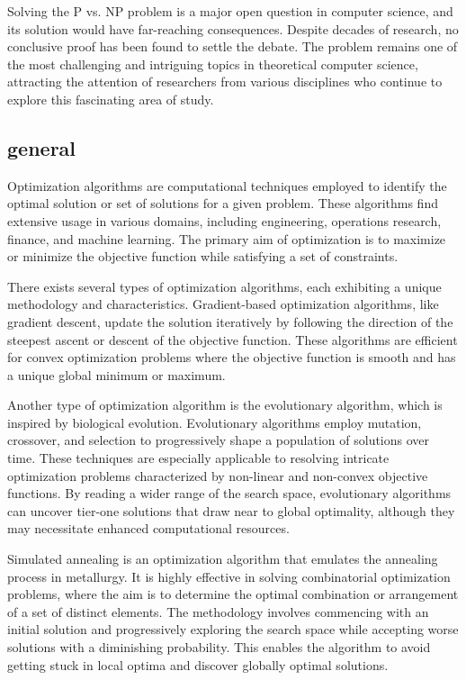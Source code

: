 Solving the P vs. NP problem is a major open question in computer science, and its solution would have far-reaching consequences. Despite decades of research, no conclusive proof has been found to settle the debate. The problem remains one of the most challenging and intriguing topics in theoretical computer science, attracting the attention of researchers from various disciplines who continue to explore this fascinating area of study.


\subsection{general}
Optimization algorithms are computational techniques employed to identify the optimal solution or set of solutions for a given problem. These algorithms find extensive usage in various domains, including engineering, operations research, finance, and machine learning. The primary aim of optimization is to maximize or minimize the objective function while satisfying a set of constraints.

There exists several types of optimization algorithms, each exhibiting a unique methodology and characteristics.   Gradient-based optimization algorithms, like gradient descent, update the solution iteratively by following the direction of the steepest ascent or descent of the objective function. These algorithms are efficient for convex optimization problems where the objective function is smooth and has a unique global minimum or maximum.

Another type of optimization algorithm is the evolutionary algorithm, which is inspired by biological evolution. Evolutionary algorithms employ mutation, crossover, and selection to progressively shape a population of solutions over time. These techniques are especially applicable to resolving intricate optimization problems characterized by non-linear and non-convex objective functions. By reading a wider range of the search space, evolutionary algorithms can uncover tier-one solutions that draw near to global optimality, although they may necessitate enhanced computational resources.

Simulated annealing is an optimization algorithm that emulates the annealing process in metallurgy. It is highly effective in solving combinatorial optimization problems, where the aim is to determine the optimal combination or arrangement of a set of distinct elements. The methodology involves commencing with an initial solution and progressively exploring the search space while accepting worse solutions with a diminishing probability. This enables the algorithm to avoid getting stuck in local optima and discover globally optimal solutions.

